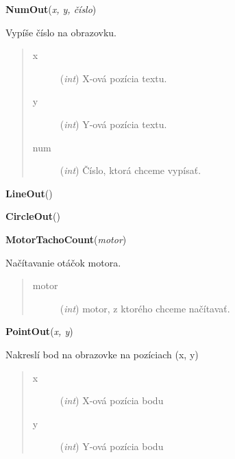\documentclass[10pt,a4paper]{article}
\begin{document}
 

\vspace{6pt}
{\bf NumOut}({\it x, y, číslo}) 
    
    Vypíše číslo na obrazovku.
 



    

\begin{quote}
    \begin{description}
        
\item[x] ({\emph{int}}) X-ová pozícia textu.

\item[y] ({\emph{int}})  Y-ová pozícia textu.

\item[num] ({\emph{int}}) Číslo, ktorá chceme vypísať.

    \end{description}
\end{quote}

 

\vspace{6pt}
{\bf LineOut}({\it }) 

 

\vspace{6pt}
{\bf CircleOut}({\it }) 

 

\vspace{6pt}
{\bf MotorTachoCount}({\it motor}) 
    
    Načítavanie otáčok motora.


    

\begin{quote}
    \begin{description}
        
\item[motor] ({\emph{int}}) motor, z ktorého chceme načítavať.

    \end{description}
\end{quote}

 

\vspace{6pt}
{\bf PointOut}({\it x, y}) 
    
    Nakreslí bod na obrazovke na pozíciach (x, y)



    

\begin{quote}
    \begin{description}
        
\item[x] ({\emph{int}}) X-ová pozícia bodu

\item[y] ({\emph{int}}) Y-ová pozícia bodu

    \end{description}
\end{quote}
\end{document}
